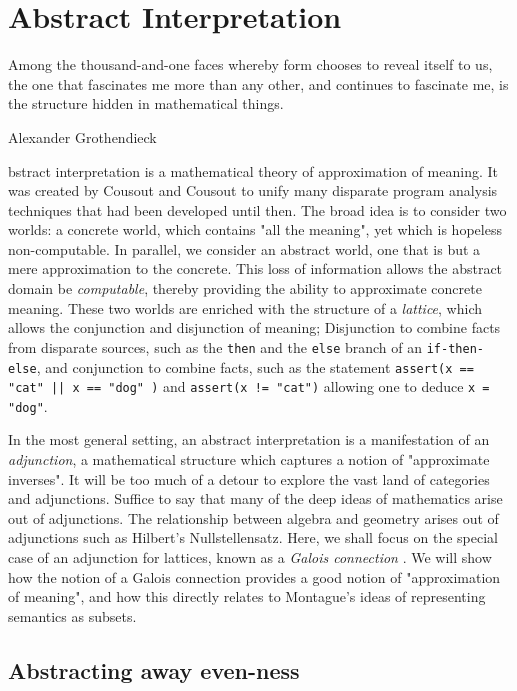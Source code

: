 \documentclass[11pt]{book}
\begin{document}
\section{Abstract Interpretation}
\label{chapter:abstract-interpretation}
\epigraph{Among the thousand-and-one faces whereby form chooses to reveal itself to us, the one that fascinates me more than any other, and continues to fascinate me, is the structure hidden in mathematical things.}{Alexander Grothendieck}

bstract interpretation is a mathematical theory of approximation of meaning.
It was created by Cousout and Cousout to unify many disparate program analysis
techniques that had been developed until then. The broad idea is to consider
two worlds: a concrete world, which contains "all the meaning", yet which is
hopeless non-computable. In parallel, we consider an abstract world, one that
is but a mere approximation to the concrete. This loss of information allows
the abstract domain be \emph{computable}, thereby providing the ability to
approximate concrete meaning. These two worlds are enriched with the structure
of a \emph{lattice}, which allows the conjunction and disjunction of meaning;
Disjunction to combine facts from disparate sources, such as the \texttt{then}
and the \texttt{else} branch of an \texttt{if-then-else}, and conjunction to
combine facts, such as the statement \texttt{assert(x == "cat" || x == "dog" )}
and \texttt{assert(x != "cat")} allowing one to deduce \texttt{x = "dog"}.


In the most general setting, an abstract interpretation is a manifestation of
an \emph{adjunction}, a mathematical structure which captures a notion of
"approximate inverses". It will be too much of a detour to explore the vast
land of categories and adjunctions. Suffice to say that many of the deep ideas
of mathematics arise out of adjunctions. The relationship between algebra and
geometry arises out of adjunctions such as Hilbert's Nullstellensatz.
Here, we shall focus on the special case of an adjunction for lattices, known
as a \emph{Galois connection} \cite{cousout1992comparing}. We will show how the notion of a Galois
connection provides a good notion of "approximation of meaning", and how this
directly relates to Montague's ideas of representing semantics as subsets.

\subsection{Abstracting away even-ness}
\end{document}
